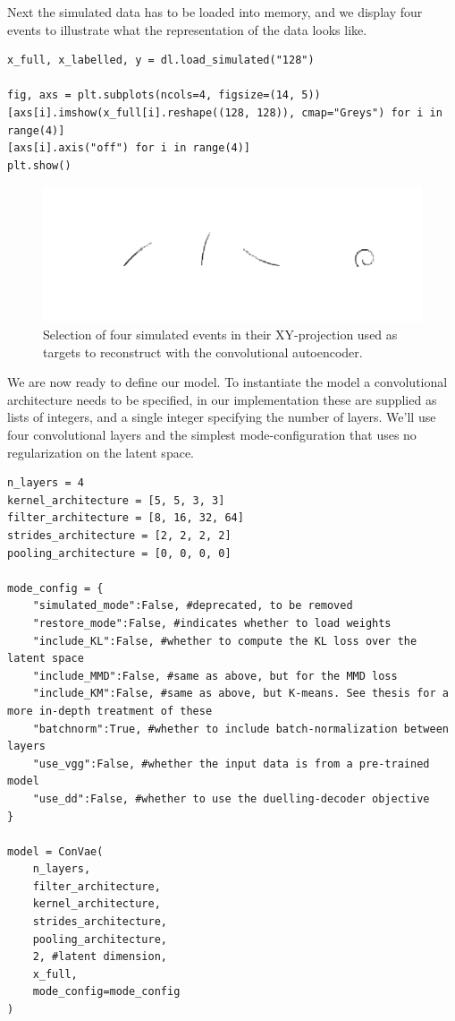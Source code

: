 \noindent Next the simulated data has to be loaded into memory, and we display four events to illustrate what the representation of the data  looks like.  

\begin{minipage}{\linewidth}
\begin{lstlisting}[language=iPython]
x_full, x_labelled, y = dl.load_simulated("128")

fig, axs = plt.subplots(ncols=4, figsize=(14, 5))
[axs[i].imshow(x_full[i].reshape((128, 128)), cmap="Greys") for i in range(4)]
[axs[i].axis("off") for i in range(4)]
plt.show()
\end{lstlisting}
\end{minipage}

\begin{figure}[H]
\centering
\includegraphics[width=\textwidth]{sim_events.pdf}
\caption[simulated events]{Selection of four simulated events in their XY-projection used as targets to reconstruct with the convolutional autoencoder.}\label{fig:sim_data}
\end{figure}

\noindent We are now ready to define our model. To instantiate the model a convolutional architecture needs to be specified, in our implementation these are supplied as lists of integers, and a single integer specifying the number of layers. We'll use four convolutional layers and the simplest mode-configuration that uses no regularization on the latent space.  

\begin{minipage}{\linewidth}
\begin{lstlisting}[language=iPython]
n_layers = 4
kernel_architecture = [5, 5, 3, 3]
filter_architecture = [8, 16, 32, 64]
strides_architecture = [2, 2, 2, 2]
pooling_architecture = [0, 0, 0, 0]

mode_config = {
    "simulated_mode":False, #deprecated, to be removed
    "restore_mode":False, #indicates whether to load weights 
    "include_KL":False, #whether to compute the KL loss over the latent space
    "include_MMD":False, #same as above, but for the MMD loss
    "include_KM":False, #same as above, but K-means. See thesis for a more in-depth treatment of these
    "batchnorm":True, #whether to include batch-normalization between layers
    "use_vgg":False, #whether the input data is from a pre-trained model 
    "use_dd":False, #whether to use the duelling-decoder objective 
}

model = ConVae(
    n_layers,
    filter_architecture,
    kernel_architecture,
    strides_architecture,
    pooling_architecture,
    2, #latent dimension,
    x_full,
    mode_config=mode_config
)
\end{lstlisting}
\end{minipage}


